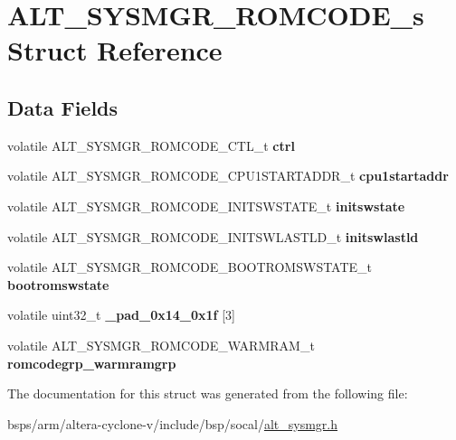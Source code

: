 \hypertarget{structALT__SYSMGR__ROMCODE__s}{}\section{A\+L\+T\+\_\+\+S\+Y\+S\+M\+G\+R\+\_\+\+R\+O\+M\+C\+O\+D\+E\+\_\+s Struct Reference}
\label{structALT__SYSMGR__ROMCODE__s}
\subsection*{Data Fields}
\begin{DoxyCompactItemize}
\item 
\mbox{\label{structALT__SYSMGR__ROMCODE__s_a4d9e7f2b88898cf0b5306cbdd47faff0}} 
volatile A\+L\+T\+\_\+\+S\+Y\+S\+M\+G\+R\+\_\+\+R\+O\+M\+C\+O\+D\+E\+\_\+\+C\+T\+L\+\_\+t {\bfseries ctrl}
\item 
\mbox{\label{structALT__SYSMGR__ROMCODE__s_a9785f3caba56d8617ec4fe5e07f0daa1}} 
volatile A\+L\+T\+\_\+\+S\+Y\+S\+M\+G\+R\+\_\+\+R\+O\+M\+C\+O\+D\+E\+\_\+\+C\+P\+U1\+S\+T\+A\+R\+T\+A\+D\+D\+R\+\_\+t {\bfseries cpu1startaddr}
\item 
\mbox{\label{structALT__SYSMGR__ROMCODE__s_ae423ac25c59d6e800858e478320cfe4f}} 
volatile A\+L\+T\+\_\+\+S\+Y\+S\+M\+G\+R\+\_\+\+R\+O\+M\+C\+O\+D\+E\+\_\+\+I\+N\+I\+T\+S\+W\+S\+T\+A\+T\+E\+\_\+t {\bfseries initswstate}
\item 
\mbox{\label{structALT__SYSMGR__ROMCODE__s_a9c427a95676fad5f98a78a811553e6f8}} 
volatile A\+L\+T\+\_\+\+S\+Y\+S\+M\+G\+R\+\_\+\+R\+O\+M\+C\+O\+D\+E\+\_\+\+I\+N\+I\+T\+S\+W\+L\+A\+S\+T\+L\+D\+\_\+t {\bfseries initswlastld}
\item 
\mbox{\label{structALT__SYSMGR__ROMCODE__s_aad61bfd4d78d6e390c6677ee5dd3071f}} 
volatile A\+L\+T\+\_\+\+S\+Y\+S\+M\+G\+R\+\_\+\+R\+O\+M\+C\+O\+D\+E\+\_\+\+B\+O\+O\+T\+R\+O\+M\+S\+W\+S\+T\+A\+T\+E\+\_\+t {\bfseries bootromswstate}
\item 
\mbox{\label{structALT__SYSMGR__ROMCODE__s_a1ac603c796ed7c440cb9cc17ea35eb69}} 
volatile uint32\+\_\+t {\bfseries \+\_\+pad\+\_\+0x14\+\_\+0x1f} \mbox{[}3\mbox{]}
\item 
\mbox{\label{structALT__SYSMGR__ROMCODE__s_a76cda7a8858570b860b3cb4f6c411217}} 
volatile A\+L\+T\+\_\+\+S\+Y\+S\+M\+G\+R\+\_\+\+R\+O\+M\+C\+O\+D\+E\+\_\+\+W\+A\+R\+M\+R\+A\+M\+\_\+t {\bfseries romcodegrp\+\_\+warmramgrp}
\end{DoxyCompactItemize}


The documentation for this struct was generated from the following file\+:\begin{DoxyCompactItemize}
\item 
bsps/arm/altera-\/cyclone-\/v/include/bsp/socal/\mbox{\hyperlink{alt__sysmgr_8h}{alt\+\_\+sysmgr.\+h}}\end{DoxyCompactItemize}

